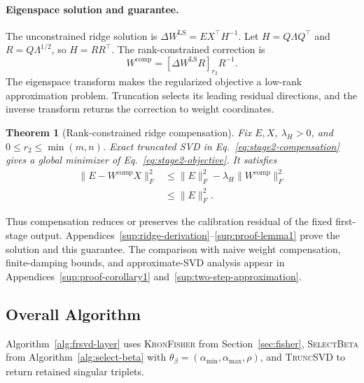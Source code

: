 \documentclass[11pt]{article}
\newtheorem{theorem}{Theorem}
\begin{document}
\paragraph{Eigenspace solution and guarantee.}
The unconstrained ridge solution is $\Delta W^{\mathrm{LS}}=EX^\top H^{-1}$. Let $H=Q\Lambda Q^\top$ and $R=Q\Lambda^{1/2}$, so $H=RR^\top$. The rank-constrained correction is
\begin{equation}
W^{\mathrm{comp}}=[\Delta W^{\mathrm{LS}}R]_{r_2}R^{-1}.
\label{eq:stage2-compensation}
\end{equation}
The eigenspace transform makes the regularized objective a low-rank approximation problem. Truncation selects its leading residual directions, and the inverse transform returns the correction to weight coordinates.

\begin{theorem}[Rank-constrained ridge compensation]\label{thm:ridge-compensation}
Fix $E,X$, $\lambda_H>0$, and $0\le r_2\le\min(m,n)$. Exact truncated SVD in Eq.~\eqref{eq:stage2-compensation} gives a global minimizer of Eq.~\eqref{eq:stage2-objective}. It satisfies
\begin{equation}
\begin{aligned}
\|E-W^{\mathrm{comp}}X\|_F^2
&\le\|E\|_F^2-\lambda_H\|W^{\mathrm{comp}}\|_F^2\\
&\le\|E\|_F^2.
\end{aligned}
\label{eq:lemma-residual}
\end{equation}
\end{theorem}
Thus compensation reduces or preserves the calibration residual of the fixed first-stage output. Appendices~\ref{sup:ridge-derivation}--\ref{sup:proof-lemma1} prove the solution and this guarantee. The comparison with naive weight compensation, finite-damping bounds, and approximate-SVD analysis appear in Appendices~\ref{sup:proof-corollary1} and~\ref{sup:two-step-approximation}.

\subsection{Overall Algorithm}\label{sec:overall-algo}

Algorithm~\ref{alg:frsvd-layer} uses \textsc{KronFisher} from Section~\ref{sec:fisher}, \textsc{SelectBeta} from Algorithm~\ref{alg:select-beta} with $\theta_\beta=(\alpha_{\min},\alpha_{\max},\rho)$, and \textsc{TruncSVD} to return retained singular triplets.
\end{document}
